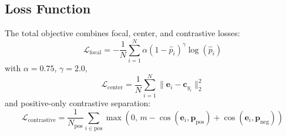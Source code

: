 \documentclass[10pt,letterpaper]{article}
\begin{document}
                                                                                                                  \subsection*{Loss Function}
                                                                                                                  The total objective combines focal, center, and contrastive losses:
                                                                                                                  \begin{equation}
                                                                                                                  \label{eq:loss_focal}
                                                                                                                  \mathcal{L}_{\text{focal}} = -\frac{1}{N}\sum_{i=1}^{N}\alpha(1-\hat{p}_i)^\gamma \log(\hat{p}_i)
                                                                                                                  \end{equation}
                                                                                                                  with $\alpha=0.75$, $\gamma=2.0$,
                                                                                                                  \begin{equation}
                                                                                                                  \mathcal{L}_{\text{center}} = \frac{1}{N}\sum_{i=1}^{N}\|\mathbf{e}_i - \mathbf{c}_{y_i}\|_2^2
                                                                                                                  \end{equation}
                                                                                                                  and positive-only contrastive separation:
                                                                                                                  \begin{equation}
                                                                                                                  \mathcal{L}_{\text{contrastive}}=\frac{1}{N_{\text{pos}}}\sum_{i\in \text{pos}}
                                                                                                                  \max\left(0,\, m-\cos(\mathbf{e}_i,\mathbf{p}_{\text{pos}})+\cos(\mathbf{e}_i,\mathbf{p}_{\text{neg}})\right)
                                                                                                                  \end{equation}
\end{document}
